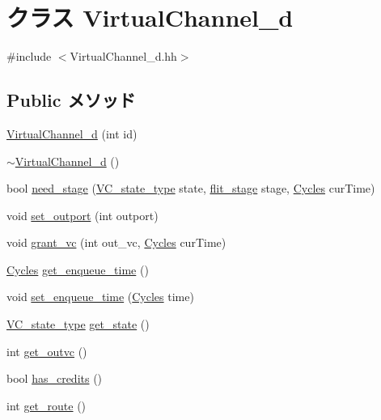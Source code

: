 \hypertarget{classVirtualChannel__d}{
\section{クラス VirtualChannel\_\-d}
\label{classVirtualChannel__d}
}


{\ttfamily \#include $<$VirtualChannel\_\-d.hh$>$}\subsection*{Public メソッド}
\begin{DoxyCompactItemize}
\item 
\hyperlink{classVirtualChannel__d_a27059efb5c173261a1ee230ff9f958f9}{VirtualChannel\_\-d} (int id)
\item 
\hyperlink{classVirtualChannel__d_a5d3a84cee64470c16b425f9b2a22f397}{$\sim$VirtualChannel\_\-d} ()
\item 
bool \hyperlink{classVirtualChannel__d_a960a054abffa235924cfa89f938c53df}{need\_\-stage} (\hyperlink{NetworkHeader_8hh_aaafaa208359111dcd9f4d47ff377da76}{VC\_\-state\_\-type} state, \hyperlink{NetworkHeader_8hh_a1af1206699d48009a5cbd0c2c1d7ce15}{flit\_\-stage} stage, \hyperlink{classCycles}{Cycles} curTime)
\item 
void \hyperlink{classVirtualChannel__d_a2442dba51e5ab72ff066826cf9ab09cf}{set\_\-outport} (int outport)
\item 
void \hyperlink{classVirtualChannel__d_a4f1041428fbfcf7c0db1b9032437c533}{grant\_\-vc} (int out\_\-vc, \hyperlink{classCycles}{Cycles} curTime)
\item 
\hyperlink{classCycles}{Cycles} \hyperlink{classVirtualChannel__d_a8b7947d2d5ef2f4c39d644d6b8070acb}{get\_\-enqueue\_\-time} ()
\item 
void \hyperlink{classVirtualChannel__d_a0085608a6cbefba0baab19a2fcb0e27b}{set\_\-enqueue\_\-time} (\hyperlink{classCycles}{Cycles} time)
\item 
\hyperlink{NetworkHeader_8hh_aaafaa208359111dcd9f4d47ff377da76}{VC\_\-state\_\-type} \hyperlink{classVirtualChannel__d_a98903fcefba4495876a823919d088853}{get\_\-state} ()
\item 
int \hyperlink{classVirtualChannel__d_a24b86446f92393208caa8f73c96d121f}{get\_\-outvc} ()
\item 
bool \hyperlink{classVirtualChannel__d_a67a31e9d15b406c89bd971df2e57e91d}{has\_\-credits} ()
\item 
int \hyperlink{classVirtualChannel__d_a4cafbc86e146cbf615a6045d5059a420}{get\_\-route} ()

\end{DoxyCompactItemize}
